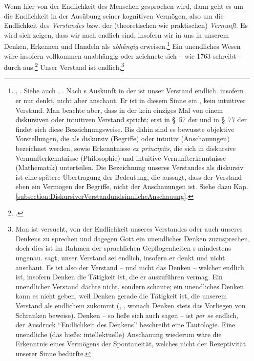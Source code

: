 Wenn hier von der Endlichkeit des Menschen gesprochen wird, dann geht es um die
Endlichkeit in der Ausübung seiner kognitiven Vermögen, also um die Endlichkeit
des \emph{Verstandes} bzw. der (theoretischen wie praktischen) \emph{Vernunft}. Es
wird sich zeigen, dass wir nach  endlich sind,
insofern wir in uns in unserem Denken, Erkennen
und Handeln als \emph{abhängig} erweisen.\footnote{\cite[Vgl.][B
72]{Kant:KritikderreinenVernunft2003}, \cite[][III: 72.29--73.4]{Kant:GesammelteWerke1900ff.}. Siehe auch
\cite[][\S~10]{Kant:Demundisensibilisatqueintelligibilisformaetprincipiis1968},
\cite[][II: 396.19--397.4]{Kant:GesammelteWerke1900ff.}. Nach
s Auskunft in der  ist
unser Verstand endlich, insofern er nur denkt, nicht aber anschaut.
Er ist in diesem Sinne ein , kein intuitiver
Verstand. Man beachte aber, dass  in der  kein einziges Mal von einem diskursiven oder intuitiven
Verstand spricht; erst in \S~57 der  und in \S~77 der
 findet sich diese Bezeichnungsweise. Bis dahin sind es
bewusste objektive Vorstellungen, die als diskursiv (Begriffe) oder intuitiv (Anschauungen)
bezeichnet werden, sowie Erkenntnisse \emph{ex principiis}, die sich in
diskursive Vernunfterkenntnisse (Philosophie) und intuitive Vernunfterkenntnisse
(Mathematik) unterteilen. Die Bezeichnung unseres Verstandes als diskursiv ist
eine spätere Übertragung der Bedeutung, die aussagt, dass der Verstand eben ein
Vermögen der Begriffe, nicht der Anschauungen ist. Siehe dazu Kap.
\ref{subsection:DiskursiverVerstandundsinnlicheAnschauung}.} Ein unendliches Wesen
wäre insofern vollkommen unabhängig oder zeichnete sich -- wie
 1763 schreibt -- durch 
aus.\footnote{\cite[Vgl.][A
186\,f.,]{Kant:DereinzigmoeglicheBeweisgrundvomDaseinGottes1977}
\cite[][II: 154.4--19]{Kant:GesammelteWerke1900ff.}.} Unser Verstand ist
endlich,\footnote{Man ist versucht, von der Endlichkeit unseres Verstandes oder
auch unseres Denkens zu sprechen und dagegen Gott ein unendliches Denken zuzusprechen, doch dies ist im Rahmen der
sprachlichen Gepflogenheiten s mindestens ungenau.
 sagt, unser Verstand sei endlich, insofern er denkt und
nicht anschaut. Es ist also der Verstand -- und nicht das Denken -- welcher
endlich ist, insofern Denken die Tätigkeit ist, die er auszuführen
vermag. Ein unendlicher Verstand dächte nicht, sondern schaute; ein
unendliches Denken kann es nicht geben, weil Denken gerade die Tätigkeit ist,
die unserem Verstand als endlichem
zukommt \mkbibparens{\cite[vgl.][B 71]{Kant:KritikderreinenVernunft2003},
\cite[][III: 72.10--16]{Kant:GesammelteWerke1900ff.}, wonach Denken stets das
Vorliegen von Schranken beweise}. Denken -- so ließe sich auch sagen -- ist
\emph{per se} endlich, der Ausdruck \enquote{Endlichkeit des Denkens}
beschreibt eine Tautologie. Eine unendliche (das hieße: intellektuelle)
Anschauung wiederum wäre die Erkenntnis eines Vermögens der
Spontaneität, welches nicht der Rezeptivität unserer Sinne bedürfte.}
